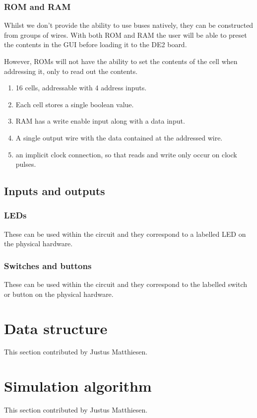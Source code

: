 \documentclass[12pt, a4paper, oneside,titlepage]{article}
\begin{document}
\subsubsection{ROM and RAM}
Whilst we don't provide the ability to use buses natively, they can be constructed from groups of wires. With both ROM and RAM the user will be able to preset the contents in the GUI before loading it to the DE2 board. 

However, ROMs will not have the ability to set the contents of the cell when addressing it, only to read out the contents. 

\begin{enumerate}
\item 16 cells, addressable with 4 address inputs.
\item Each cell stores a single boolean value. 
\item RAM has a write enable input along with a data input.
\item A single output wire with the data contained at the addressed wire. 
\item an implicit clock connection, so that reads and write only occur on clock pulses.
\end{enumerate}

\subsection{Inputs and outputs}
\subsubsection{LEDs}
These can be used within the circuit and they correspond to a labelled LED on the physical hardware.
\subsubsection{Switches and buttons}
These can be used within the circuit and they correspond to the labelled switch or button on the physical hardware. 

\section{Data structure}
\label{sec:datastruct}
This section contributed by Justus Matthiesen.

\section{Simulation algorithm}
This section contributed by Justus Matthiesen. 
\end{document}
